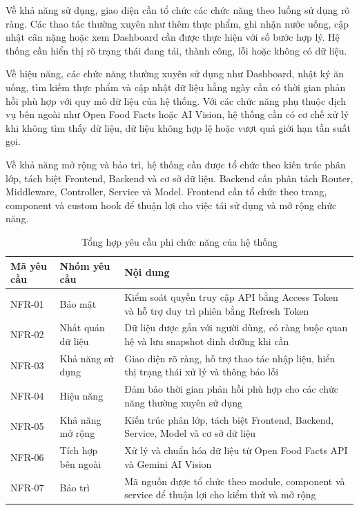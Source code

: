 \documentclass[12pt, a4paper]{report}
\begin{document}
Về khả năng sử dụng, giao diện cần tổ chức các chức năng theo luồng sử dụng rõ ràng. Các thao tác thường xuyên như thêm thực phẩm, ghi nhận nước uống, cập nhật cân nặng hoặc xem Dashboard cần được thực hiện với số bước hợp lý. Hệ thống cần hiển thị rõ trạng thái đang tải, thành công, lỗi hoặc không có dữ liệu.

Về hiệu năng, các chức năng thường xuyên sử dụng như Dashboard, nhật ký ăn uống, tìm kiếm thực phẩm và cập nhật dữ liệu hằng ngày cần có thời gian phản hồi phù hợp với quy mô dữ liệu của hệ thống. Với các chức năng phụ thuộc dịch vụ bên ngoài như Open Food Facts hoặc AI Vision, hệ thống cần có cơ chế xử lý khi không tìm thấy dữ liệu, dữ liệu không hợp lệ hoặc vượt quá giới hạn tần suất gọi.

Về khả năng mở rộng và bảo trì, hệ thống cần được tổ chức theo kiến trúc phân lớp, tách biệt Frontend, Backend và cơ sở dữ liệu. Backend cần phân tách Router, Middleware, Controller, Service và Model. Frontend cần tổ chức theo trang, component và custom hook để thuận lợi cho việc tái sử dụng và mở rộng chức năng.

\begin{table}[htbp]
\centering
\caption{Tổng hợp yêu cầu phi chức năng của hệ thống}
\begin{tabular}{|p{4cm}|p{4cm}|p{7cm}|}
\hline
\textbf{Mã yêu cầu} & \textbf{Nhóm yêu cầu} & \textbf{Nội dung} \\
\hline
NFR-01 & Bảo mật & Kiểm soát quyền truy cập API bằng Access Token và hỗ trợ duy trì phiên bằng Refresh Token \\
\hline
NFR-02 & Nhất quán dữ liệu & Dữ liệu được gắn với người dùng, có ràng buộc quan hệ và lưu snapshot dinh dưỡng khi cần \\
\hline
NFR-03 & Khả năng sử dụng & Giao diện rõ ràng, hỗ trợ thao tác nhập liệu, hiển thị trạng thái xử lý và thông báo lỗi \\
\hline
NFR-04 & Hiệu năng & Đảm bảo thời gian phản hồi phù hợp cho các chức năng thường xuyên sử dụng \\
\hline
NFR-05 & Khả năng mở rộng & Kiến trúc phân lớp, tách biệt Frontend, Backend, Service, Model và cơ sở dữ liệu \\
\hline
NFR-06 & Tích hợp bên ngoài & Xử lý và chuẩn hóa dữ liệu từ Open Food Facts API và Gemini AI Vision \\
\hline
NFR-07 & Bảo trì & Mã nguồn được tổ chức theo module, component và service để thuận lợi cho kiểm thử và mở rộng \\
\hline
\end{tabular}
\end{table}
\end{document}
